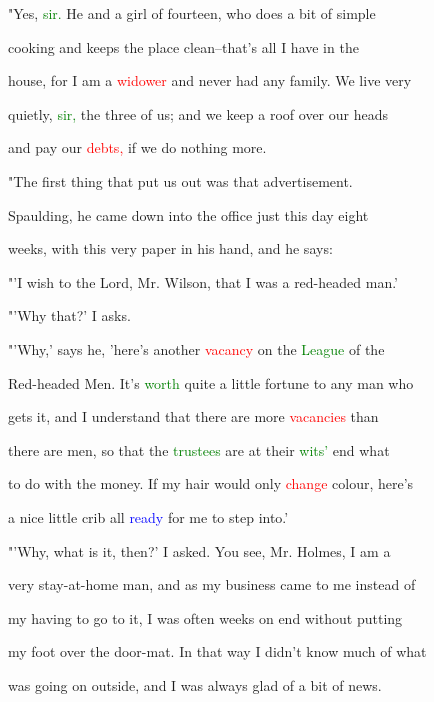  "Yes, \textcolor{green}{sir.} He and a girl of fourteen, who does a bit of simple

 cooking and keeps the place clean--that's all I have in the

 house, for I am a \textcolor{red}{widower} and never had any family. We live very

 quietly, \textcolor{green}{sir,} the three of us; and we keep a roof over our heads

 and \textcolor{BurntOrange}{pay} our \textcolor{red}{debts,} if we do nothing more.



 "The first thing that put us out was that advertisement.

 Spaulding, he came down into the office just this day eight

 weeks, with this very paper in his hand, and he says:



 "'I wish to the \textcolor{BurntOrange}{Lord,} Mr. Wilson, that I was a red-headed man.'



 "'Why that?' I asks.



 "'Why,' says he, 'here's another \textcolor{red}{vacancy} on the \textcolor{green}{League} of the

 Red-headed Men. It's \textcolor{green}{worth} quite a little \textcolor{BurntOrange}{fortune} to any man who

 gets it, and I understand that there are more \textcolor{red}{vacancies} than

 there are men, so that the \textcolor{green}{trustees} are at their \textcolor{green}{wits'} end what

 to do with the \textcolor{BurntOrange}{money.} If my hair would only \textcolor{red}{change} colour, here's

 a nice little crib all \textcolor{blue}{ready} for me to step into.'



 "'Why, what is it, then?' I asked. You see, Mr. Holmes, I am a

 very stay-at-home man, and as my business came to me instead of

 my having to go to it, I was often weeks on end without putting

 my foot over the door-mat. In that way I didn't know much of what

 was going on outside, and I was always \textcolor{BurntOrange}{glad} of a bit of news.



